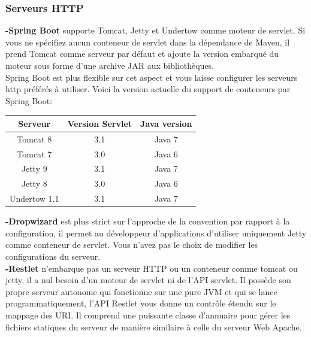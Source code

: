 \documentclass[12pt, a4paper, openany]{report}
\begin{document}
   \subsubsection{Serveurs HTTP}
   \textbf{-Spring Boot} supporte Tomcat, Jetty et Undertow comme moteur de servlet. Si vous ne spécifiez aucun conteneur de servlet dans la dépendance de Maven, il prend Tomcat comme serveur par défaut et ajoute la version embarqué du moteur sous forme d'une archive JAR aux bibliothèques. \\
   Spring Boot est plus flexible sur cet aspect et vous laisse configurer les serveurs http préférés à utiliser. Voici la version actuelle du support de conteneurs par Spring Boot:
   
   \begin{center}
   \begin{tabular}{|c|c|c|}
    \hline
    
    \rowcolor[rgb]{0.5,0.5,0}\textbf{Serveur}&\textbf{Version Servlet}&\textbf{Java version} \\ \hline
    
     Tomcat 8 & 3.1  & Java 7 \\ \hline
     
     Tomcat 7 &  3.0 & Java 6 \\ \hline
     
     Jetty 9 & 3.1 & Java 7 \\ \hline
     
     Jetty 8 & 3.0 & Java 6 \\ \hline
     
     Undertow 1.1 & 3.1 & Java 7 \\ \hline
     
   \end{tabular}
   \label{tab6}
   \end{center}

   \textbf{-Dropwizard} est plus strict sur l'approche de la convention par rapport à la configuration, il permet au développeur d'applications d'utiliser uniquement Jetty comme conteneur de servlet. Vous n'avez pas le choix de modifier les configurations du serveur. \\
   
   \textbf{-Restlet} n'embarque pas un serveur HTTP ou un conteneur comme tomcat ou jetty, il a nul besoin d'un moteur de servlet ni de l'API servlet. Il possède son propre serveur autonome qui fonctionne sur une pure JVM et qui se lance programmatiquement, l'API Restlet vous donne un contrôle étendu sur le mappage des URI. Il comprend une puissante classe d'annuaire pour gérer les fichiers statiques du serveur de manière similaire à celle du serveur Web Apache.\\
\end{document}
